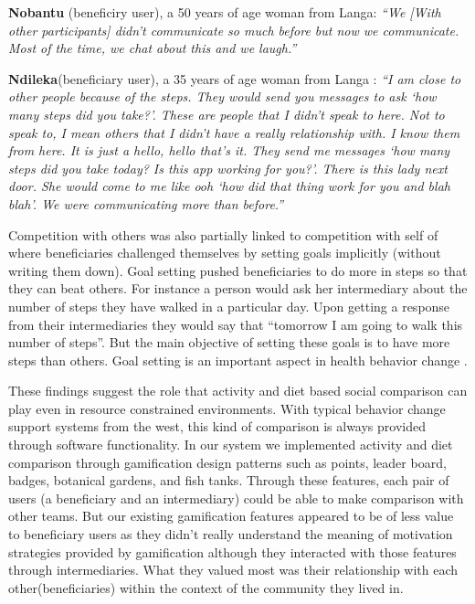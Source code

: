 \documentclass{sig-alternate}
\begin{document}
\textbf{Nobantu} (beneficiry user), a 50 years of age woman from Langa: 
\textit{``We [With other participants] didn't communicate so much before but 
now we communicate. Most of the time, we chat about this and we laugh.''}\newline\newline 

\textbf{Ndileka}(beneficiary user),  a 35 years of age woman from Langa : 
\textit{``I am close to other people because of the steps. They would send 
you messages to ask `how many steps did you take?'. These are people that I 
didn't speak to here. Not to speak to, I mean others that I didn't have a 
really relationship with. I know them from here. It is just a hello, hello 
that's it. They send me messages `how many steps did you take today? Is this 
app working for you?'. There is this lady next door. She would come to me 
like ooh `how did that thing work for you and blah blah'. We were 
communicating more than before.''}\newline\newline

Competition with others was also partially linked to competition with self of
where beneficiaries challenged themselves by setting goals implicitly (without
writing them down). Goal setting pushed beneficiaries to do more in steps so
that they can beat others. For instance a person would ask her intermediary
about the number of steps they have walked in a particular day. Upon getting a
response from their intermediaries they would say that ``tomorrow I am going
to walk this number of steps''. But the main objective of setting these goals
is to have more steps than others. Goal setting is an important aspect in
health behavior change \cite{strecher1995goal}.


These findings suggest the role that activity and diet based social comparison
can play even in resource constrained environments. With typical behavior
change support systems from the west, this kind of comparison is always
provided through software functionality. In our system we implemented activity
and diet comparison through gamification design patterns such as points,
leader board, badges, botanical gardens, and fish tanks. Through these
features, each pair of users (a beneficiary and an intermediary) could be able
to make comparison with other teams. But our existing gamification features
appeared to be of less value to beneficiary users as they didn't really
understand the meaning of motivation strategies provided by gamification
although they interacted with those features through intermediaries. What they
valued most was their relationship with each other(beneficiaries) within the
context of the community they lived in.
\end{document}
